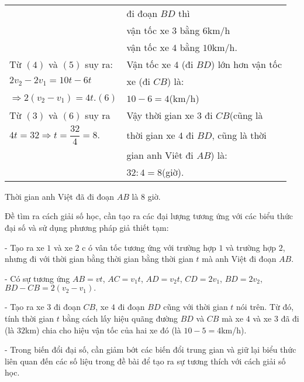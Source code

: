 \begin{tabular}{|l|l|}
& đi đoạn $BD$ thì\\
& vận tốc xe $3$ bằng $6$km/h\\
& vận tốc xe $4$ bằng $10$km/h.\\
\hline
Từ $(4)$ và $(5)$ suy ra: & Vận tốc xe $4$ (đi $BD$) lớn hơn vận tốc \\
$2v_2 - 2 v_1 = 10t-6t$& xe  (đi $CB$) là:\\
$\Rightarrow 2 (v_2 - v_1) = 4 t. (6)$ & $10-6=4$(km/h)\\
\hline
Từ $(3)$ và $(6)$ suy ra & Vậy thời gian xe $3$ đi $CB$(cũng là\\
$4t=32 \Rightarrow t = \dfrac{32}{4}=8.$& thời gian xe $4$ đi $BD$, cũng là thời\\
 &gian anh Viêt đi $AB$) là:\\
 & $32 : 4 = 8$(giờ).\\
 \hline
\end{tabular}
 Thời gian anh Việt đã đi đoạn $AB$ là $8$ giờ.

 Đề tìm ra cách giải số học, cần tạo ra các đại lượng  tương ứng với các biểu thức đại số và sử dụng phương pháp giả thiết tạm:

 - Tạo ra xe $1$ và xe $2$ c ó vân tốc tương ứng  với trường hợp $1$ và trường hợp $2$, nhưng đi với thời gian bằng thời gian bằng thời gian $t$ mà anh Việt đi đoạn $AB$.

 - Có sự tương ứng $AB=vt$, $AC=v_1 t$, $AD=v_2t$, $CD=2v_1$, $BD=2v_2$, $BD-CB=2(v_2 - v_1).$

 - Tạo ra xe $3$ đi đoạn $CB$, xe $4$ đi đoạn $BD$ cũng với thời gian $t$ nói trên. Từ đó, tính thời gian $t$ bằng cách lấy hiệu quãng đường $BD$ và $CB$ mà xe $4$ và xe $3$ đã đi (là $32$km)  chia cho hiệu vận tốc của hai xe đó (là $10-5=4$km/h).

 - Trong biến đổi đại số, cần giảm bớt các biến đổi trung gian và giữ lại biểu thức liên quan đến các số liệu trong đề bài để tạo ra sự tương thích với cách giải số học.

